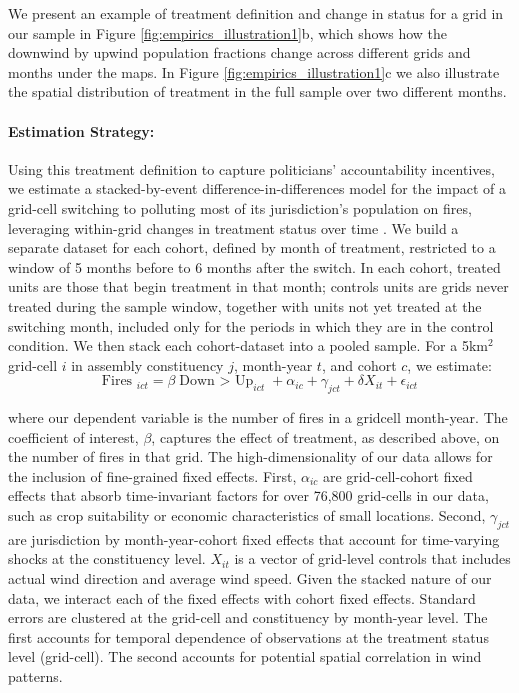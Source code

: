 \documentclass[12pt]{article}
\begin{document}
We present an example of treatment definition and change in status for a grid in our sample in Figure \ref{fig:empirics_illustration1}b, which shows how the downwind by upwind population fractions change across different grids and months under the maps. In Figure \ref{fig:empirics_illustration1}c we also illustrate the spatial distribution of treatment in the full sample over two different months. 

\paragraph{Estimation Strategy:}
Using this treatment definition to capture politicians' accountability incentives, we estimate a stacked-by-event difference-in-differences model for the impact of a grid-cell switching to polluting most of its jurisdiction's population on fires, leveraging within-grid changes in treatment status over time \citep{cengiz2019effect}. 
We build a separate dataset for each cohort, defined by month of treatment, restricted to a window of 5 months before to 6 months after the switch. In each cohort, treated units are those that begin treatment in that month; controls units are grids never treated during the sample window, together with units not yet treated at the switching month, included only for the periods in which they are in the control condition. We then stack each cohort-dataset into a pooled sample. 
For a 5km$^2$ grid-cell $i$ in assembly constituency $j$, month-year $t$, and cohort $c$, we estimate:
\begin{equation}\label{eq1}
 \text{Fires }_{ict}=\beta \text{{Down $>$ Up}}_{ict}+ \alpha_{ic}+ \gamma_{jct} + \delta X_{it} + \epsilon_{ict}
\end{equation}

where our dependent variable is the number of fires in a gridcell month-year. The coefficient of interest, $\beta$, captures the effect of treatment, as described above, on the number of fires in that grid. 
The high-dimensionality of our data allows for the inclusion of fine-grained fixed effects. First, $\alpha_{ic}$ are grid-cell-cohort fixed effects that absorb time-invariant factors for over 76,800 grid-cells in our data, such as crop suitability or economic characteristics of small locations.  Second,  $\gamma_{jct}$ are jurisdiction by month-year-cohort fixed effects that account for time-varying shocks at the constituency level. $X_{it}$ is a vector of grid-level controls that includes actual wind direction and average wind speed. Given the stacked nature of our data, we interact each of the fixed effects with cohort fixed effects. Standard errors are clustered at the grid-cell and constituency by month-year level. The first accounts for temporal dependence of observations at the treatment status level (grid-cell). The second accounts for potential spatial correlation in wind patterns. 
\end{document}
